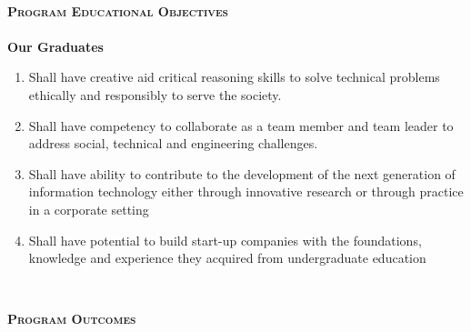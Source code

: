 \documentclass[10pt,a4paper]{report}
\begin{document}
\begin{center}
\begin{center}
		\textsc{\normalsize\mdseries\upshape }\\
		[0.50cm]
		\textsc{\large\bfseries\upshape Program Educational Objectives}\\
		\justify
		\textsc{\large\bfseries }\\
		[0.05cm]
		\textbf{\large Our Graduates }\\
		\begin{enumerate}
			\item\large Shall have creative aid critical reasoning skills to solve technical problems
			ethically and responsibly to serve the society.
			\item\large Shall have competency to collaborate as a team member and team leader to address
			social, technical and engineering challenges.
			\item\large Shall have ability to contribute to the development of the next generation of information technology either through innovative research or through practice in a corporate setting
			\item\large Shall have potential to build start-up companies with the foundations, knowledge and experience they acquired from undergraduate education

		\end{enumerate}

	\textsc{\Large\bfseries }\\

	\end{center}

	\begin{center}

		\textsc{\large\bfseries\upshape Program Outcomes}\\
		\textsc{\large\bfseries }\\
		[0.20cm]
		\justify
		\begin{enumerate}


\end{enumerate}
\end{center}
\end{center}
\end{document}
